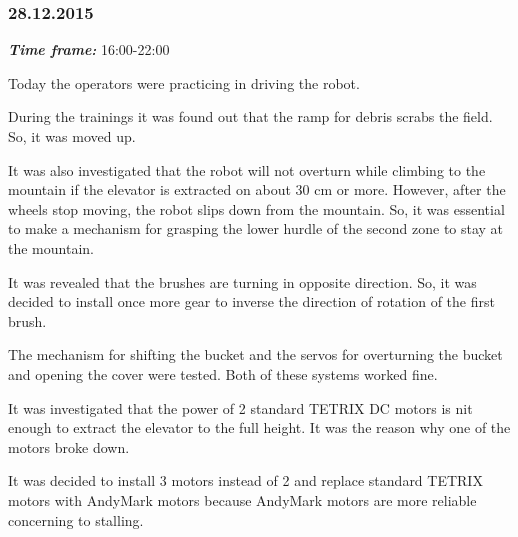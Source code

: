 \subsubsection{28.12.2015}
\textit{\textbf{Time frame:}} 16:00-22:00

Today the operators were practicing in driving the robot.

During the trainings it was found out that the ramp for debris scrabs the field. So, it was moved up.

It was also investigated that the robot will not overturn while climbing to the mountain if the elevator is extracted on about 30 cm or more. However, after the wheels stop moving, the robot slips down from the mountain. So, it was essential to make a mechanism for grasping the lower hurdle of the second zone to stay at the mountain.

It was revealed that the brushes are turning in opposite direction. So, it was decided to install once more gear to inverse the direction of rotation of the first brush.

The mechanism for shifting the bucket and the servos for overturning the bucket and opening the cover were tested. Both of these systems worked fine.

It was investigated that the power of 2 standard TETRIX DC motors is nit enough to extract the elevator to the full height. It was the reason why one of the motors broke down.

It was decided to install 3 motors instead of 2 and replace standard TETRIX motors with AndyMark motors because AndyMark motors are more reliable concerning to stalling.

